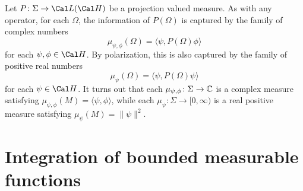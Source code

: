 Let \(P\colon\Sigma\to\Cal L(\Cal H)\) be a projection valued measure.
As with any operator, for each \(\Omega\), the information of
\(P(\Omega)\) is captured by the family of complex numbers
\begin{equation}
  \mu_{\psi,\phi}(\Omega) = \langle \psi,P(\Omega)\phi\rangle
\end{equation}
for each \(\psi,\phi\in\Cal H\).
By polarization, this is also captured by the family of positive real
numbers
\begin{equation}
  \mu_\psi(\Omega) = \langle \psi,P(\Omega)\psi\rangle
\end{equation}
for each \(\psi\in\Cal H\).
It turns out that each \(\mu_{\psi,\phi}\colon\Sigma\to\mathbb{C}\) is a
complex measure satisfying
\(\mu_{\psi,\phi}(M)=\langle\psi,\phi\rangle\), while each
\(\mu_\psi\colon\Sigma\to[0,\infty)\) is a
real positive measure satisfying \(\mu_\psi(M)=\|\psi\|^{2}\).

\section{Integration of bounded measurable functions}

